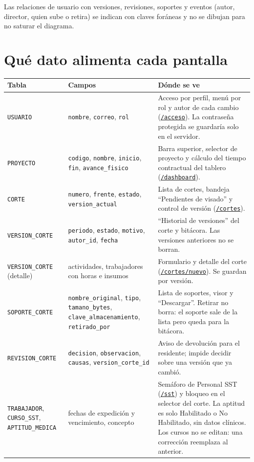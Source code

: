 \documentclass[11pt]{article}
\newcommand{\urlapp}{https://thankstochatgpt.github.io/LOARD}
\newcommand{\app}[1]{\href{\urlapp#1}{\texttt{#1}}}
\begin{document}
Las relaciones de usuario con versiones, revisiones, soportes y eventos (autor, director, quien sube o retira) se indican con claves foráneas y no se dibujan para no saturar el diagrama.

\section{Qué dato alimenta cada pantalla}

\small
\begin{longtable}{>{\raggedright\arraybackslash}p{3.3cm} >{\raggedright\arraybackslash}p{5cm} >{\raggedright\arraybackslash}p{7.2cm}}
\toprule \textbf{Tabla} & \textbf{Campos} & \textbf{Dónde se ve} \\ \midrule \endhead
\bottomrule \endfoot
\texttt{USUARIO} & \texttt{nombre}, \texttt{correo}, \texttt{rol} & Acceso por perfil, menú por rol y autor de cada cambio (\app{/acceso}). La contraseña protegida se guardaría solo en el servidor. \\
\texttt{PROYECTO} & \texttt{codigo}, \texttt{nombre}, \texttt{inicio}, \texttt{fin}, \texttt{avance\_fisico} & Barra superior, selector de proyecto y cálculo del tiempo contractual del tablero (\app{/dashboard}). \\
\texttt{CORTE} & \texttt{numero}, \texttt{frente}, \texttt{estado}, \texttt{version\_actual} & Lista de cortes, bandeja ``Pendientes de visado'' y control de versión (\app{/cortes}). \\
\texttt{VERSION\_CORTE} & \texttt{periodo}, \texttt{estado}, \texttt{motivo}, \texttt{autor\_id}, \texttt{fecha} & ``Historial de versiones'' del corte y bitácora. Las versiones anteriores no se borran. \\
\texttt{VERSION\_CORTE} (detalle) & actividades, trabajadores con horas e insumos & Formulario y detalle del corte (\app{/cortes/nuevo}). Se guardan por versión. \\
\texttt{SOPORTE\_CORTE} & \texttt{nombre\_original}, \texttt{tipo}, \texttt{tamano\_bytes}, \texttt{clave\_almacenamiento}, \texttt{retirado\_por} & Lista de soportes, visor y ``Descargar''. Retirar no borra: el soporte sale de la lista pero queda para la bitácora. \\
\texttt{REVISION\_CORTE} & \texttt{decision}, \texttt{observacion}, \texttt{causas}, \texttt{version\_corte\_id} & Aviso de devolución para el residente; impide decidir sobre una versión que ya cambió. \\
\texttt{TRABAJADOR}, \texttt{CURSO\_SST}, \texttt{APTITUD\_MEDICA} & fechas de expedición y vencimiento, concepto & Semáforo de Personal SST (\app{/sst}) y bloqueo en el selector del corte. La aptitud es solo Habilitado o No Habilitado, sin datos clínicos. Los cursos no se editan: una corrección reemplaza al anterior. \\

\end{longtable}
\end{document}
